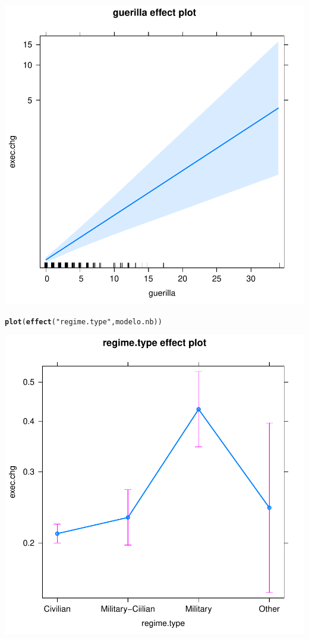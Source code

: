 \documentclass[onesided]{article}\usepackage[]{graphicx}\usepackage[]{color}
\makeatletter
\def\maxwidth{ %
  \ifdim\Gin@nat@width>\linewidth
    \linewidth
  \else
    \Gin@nat@width
  \fi
}
\newcommand{\hlstr}[1]{\textcolor[rgb]{0.192,0.494,0.8}{#1}}%
\newcommand{\hlstd}[1]{\textcolor[rgb]{0.345,0.345,0.345}{#1}}%
\newcommand{\hlkwd}[1]{\textcolor[rgb]{0.737,0.353,0.396}{\textbf{#1}}}%
\newenvironment{kframe}{%
 \def\at@end@of@kframe{}%
 \ifinner\ifhmode%
  \def\at@end@of@kframe{\end{minipage}}%
  \begin{minipage}{\columnwidth}%
 \fi\fi%
 \def\FrameCommand##1{\hskip\@totalleftmargin \hskip-\fboxsep
 \colorbox{shadecolor}{##1}\hskip-\fboxsep
     \hskip-\linewidth \hskip-\@totalleftmargin \hskip\columnwidth}%
 \MakeFramed {\advance\hsize-\width
   \@totalleftmargin\z@ \linewidth\hsize
   \@setminipage}}%
 {\par\unskip\endMakeFramed%
 \at@end@of@kframe}
\makeatother
\begin{document}
{\centering \includegraphics[width=\maxwidth]{figure/pp2-2} 

}


\begin{kframe}\begin{alltt}
\hlkwd{plot}\hlstd{(}\hlkwd{effect}\hlstd{(}\hlstr{"regime.type"}\hlstd{, modelo.nb))}
\end{alltt}
\end{kframe}

{\centering \includegraphics[width=\maxwidth]{figure/pp2-3} 

}
\end{document}
